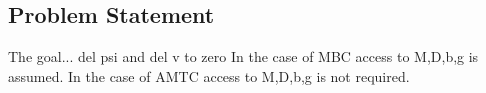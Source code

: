\subsection{Problem Statement}
\label{chUV_AMTC.sec.probStatement}

The goal... del psi and del v to zero
%
In the case of MBC access to M,D,b,g is assumed.
%
In the case of AMTC access to M,D,b,g is not required.

